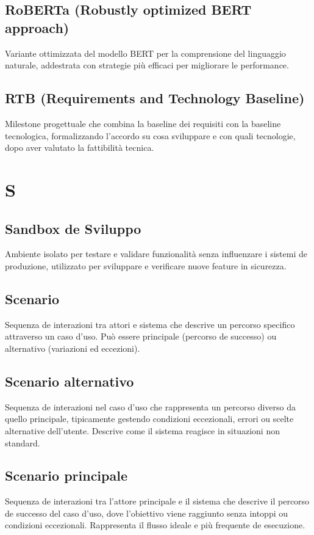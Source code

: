 \documentclass[a4paper,11pt]{article}
\begin{document}
\subsection{RoBERTa (Robustly optimized BERT approach)}
Variante ottimizzata del modello BERT per la comprensione del linguaggio naturale, addestrata con strategie più efficaci per migliorare le performance.

\subsection{RTB (Requirements and Technology Baseline)}
Milestone progettuale che combina la baseline dei requisiti con la baseline tecnologica, formalizzando l'accordo su cosa sviluppare e con quali tecnologie, dopo aver valutato la fattibilità tecnica.

\newpage
\section{S}

\subsection{Sandbox de Sviluppo}
Ambiente isolato per testare e validare funzionalità senza influenzare i sistemi de produzione, utilizzato per sviluppare e verificare nuove feature in sicurezza.

\subsection{Scenario}
Sequenza de interazioni tra attori e sistema che descrive un percorso specifico attraverso un caso d'uso. Può essere principale (percorso de successo) ou alternativo (variazioni ed eccezioni).

\subsection{Scenario alternativo}
Sequenza de interazioni nel caso d'uso che rappresenta un percorso diverso da quello principale, tipicamente gestendo condizioni eccezionali, errori ou scelte alternative dell'utente. Descrive come il sistema reagisce in situazioni non standard.

\subsection{Scenario principale}
Sequenza de interazioni tra l'attore principale e il sistema che descrive il percorso de successo del caso d'uso, dove l'obiettivo viene raggiunto senza intoppi ou condizioni eccezionali. Rappresenta il flusso ideale e più frequente de esecuzione.
\end{document}
